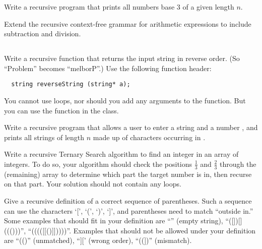\begin{exercise}
  Write a recursive program that prints all numbers base 3 of a given
  length $n$.
\end{exercise}

\begin{exercise}
  Extend the recursive context-free grammar for arithmetic expressions
  to include subtraction and division.
\end{exercise}

\subsection{\MediumQuestions}
\begin{exercise}
  Write a recursive function that returns the input string in reverse
  order. (So ``Problem'' becomes ``melborP''.)
  Use the following function header:

\begin{verbatim}
  string reverseString (string* a);
\end{verbatim}

  You cannot use loops, nor should you add any arguments to the
  function.
  But you can use the  function in the  class.
\end{exercise}

\begin{exercise}
  Write a recursive program that allows a user to enter a string
   and a number , and prints all strings of length $n$
  made up of characters occurring in .
\end{exercise}

\begin{exercise}
  Write a recursive Ternary Search algorithm to find an integer in an
  array of integers.
  To do so, your algorithm should check the positions
  $\frac{1}{3}$ and $\frac{2}{3}$ through the (remaining) array to 
  determine which part the target number is in,
  then recurse on that part.
  Your solution should not contain any loops.
\end{exercise}

\begin{exercise}
  Give a recursive definition of a correct sequence of parentheses.
  Such a sequence can use the characters `[', `(', `)', `]',
  and parentheses need to match ``outside in.''
  Some examples that should fit in your definition are
  ``'' (empty string), ``([])[]((()))'', ``(((([[()]]))))''.
  Examples that should not be allowed under your definition are
  ``(()'' (unmatched), ``][' (wrong order), ``((])'' (mismatch).
\end{exercise}

